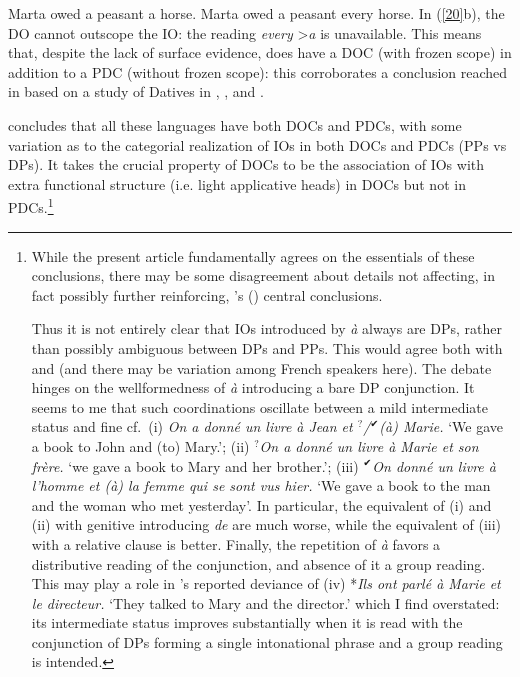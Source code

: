 \documentclass[output=paper]{langsci/langscibook}
\begin{document}
\ea \label{20}
    \ea Marta owed a peasant a horse.
    \ex Marta owed a peasant every horse.
    \z
\z
%
In (\ref{20}b), the DO cannot outscope the IO: the reading {\it every}
\textgreater {\it a} is unavailable. This means that, despite the lack of
surface evidence,   does have a \gls{DOC} (with frozen scope) in addition to a
    \gls{PDC} (without frozen scope):
    this corroborates a conclusion  reached in \cite{anagnostopoulou2005cross}
    based on a study of Datives in , , 
    and .\largerpage[-4]

\cite{anagnostopoulou2005cross} concludes that all these  languages have both
\glspl{DOC} and \glspl{PDC}, with some variation as to the categorial
realization of \glspl{IO} in both \glspl{DOC} and \glspl{PDC} (PPs vs DPs).  It
takes the crucial  property of \glspl{DOC} to be  the association of \glspl{IO}
with extra functional structure (i.e. light applicative heads) in \glspl{DOC}
but not in \glspl{PDC}.\footnote{While the present article fundamentally agrees
    on the essentials of these conclusions, there may be some disagreement
    about details not affecting, in fact possibly further reinforcing,
    \citeauthor{anagnostopoulou2005cross}'s
    (\citeyear{anagnostopoulou2005cross}) central conclusions.

    Thus it is not entirely clear that \glspl{IO} introduced by \emph{à} always
    are DPs, rather than possibly ambiguous between DPs and PPs. This would
    agree both with \cite{Kayne1975} and \cite{Vergnaud:1974} (and there may be
    variation among French speakers here). The debate hinges on the
    wellformedness of \emph{à} introducing a bare DP conjunction. It seems to
    me that such coordinations oscillate between a mild  intermediate status
    and fine cf.\ (i) \emph{On a donn\'e un livre \`a Jean et
        $^{?}$/$^{✔}$(\`a) Marie.} \enquote*{We gave a book to John and
        (to) Mary.}; (ii) \emph{$^{?}$On a donn\'e un livre \`a Marie et son
        fr\`ere.} \enquote*{we gave a book to Mary and her brother.}; (iii)
        $^{✔}$\emph{On donn\'e un livre \`a l'homme et (\`a) la femme qui
    se sont vus hier.} \enquote*{We gave a book to the man and the woman who met
    yesterday}. In particular, the equivalent of (i) and (ii) with
    genitive introducing {\it de} are much worse, while the
    equivalent of (iii) with a relative clause is better. Finally, the
    repetition of \emph{à} favors a distributive reading of the conjunction,
    and absence of it a group reading. This may play a role in
    \citeauthor{Jaeggli:1982}'s \citeyear{Jaeggli:1982} reported deviance of
    (iv) *\emph{Ils ont parl\'e \`a Marie et le directeur.} \enquote*{They talked to Mary
    and the director.} which I find overstated: its intermediate status
improves substantially when it is read with the conjunction of DPs forming a
single intonational phrase and a group reading is intended.}
\end{document}
